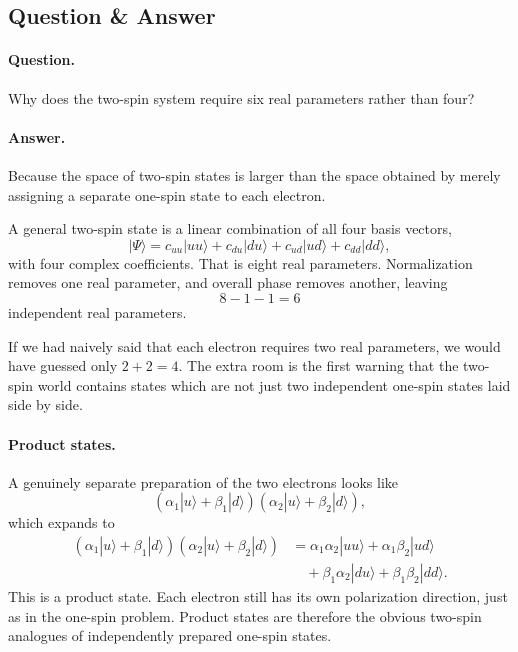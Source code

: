 \subsection{Question \& Answer}

\paragraph{Question.} Why does the two-spin system require six real parameters rather than four?

\paragraph{Answer.} Because the space of two-spin states is larger than the space obtained by merely assigning a separate one-spin state to each electron.

A general two-spin state is a linear combination of all four basis vectors,
\begin{equation}
|\Psi\rangle
=
c_{uu}|uu\rangle
+
c_{du}|du\rangle
+
c_{ud}|ud\rangle
+
c_{dd}|dd\rangle,
\end{equation}
with four complex coefficients. That is eight real parameters. Normalization removes one real parameter, and overall phase removes another, leaving
\begin{equation}
8-1-1=6
\end{equation}
independent real parameters.

If we had naively said that each electron requires two real parameters, we would have guessed only \(2+2=4\). The extra room is the first warning that the two-spin world contains states which are not just two independent one-spin states laid side by side.

\paragraph{Product states.} A genuinely separate preparation of the two electrons looks like
\begin{equation}
(\alpha_1|u\rangle+\beta_1|d\rangle)(\alpha_2|u\rangle+\beta_2|d\rangle),
\end{equation}
which expands to
\begin{align}
(\alpha_1|u\rangle+\beta_1|d\rangle)(\alpha_2|u\rangle+\beta_2|d\rangle)
&=
\alpha_1\alpha_2|uu\rangle
+
\alpha_1\beta_2|ud\rangle \\
&\quad
+
\beta_1\alpha_2|du\rangle
+
\beta_1\beta_2|dd\rangle.
\end{align}
This is a product state. Each electron still has its own polarization direction, just as in the one-spin problem. Product states are therefore the obvious two-spin analogues of independently prepared one-spin states.

